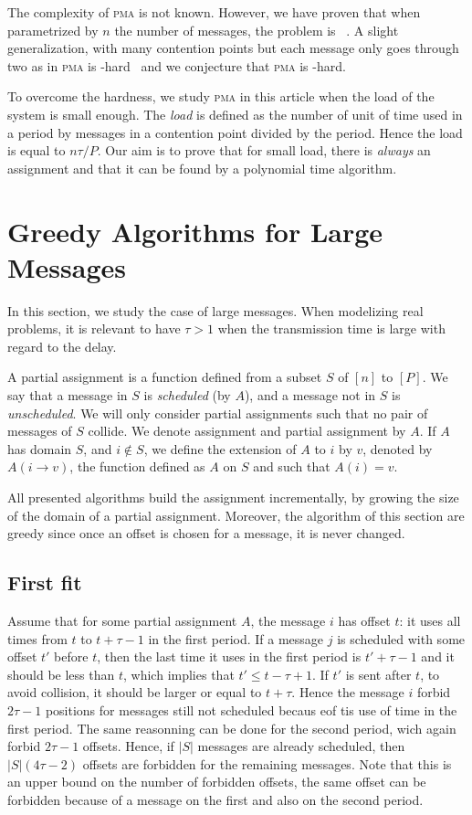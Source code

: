 \documentclass[10pt, conference, letterpaper]{IEEEtran}
\newcommand\pma{\textsc{pma}\xspace}
\begin{document}
The complexity of \pma is not known. However, we have proven that when parametrized by
$n$ the number of messages, the problem is \FPT~\cite{barth2018deterministic}.
A slight generalization, with many contention points but each message only goes through
two as in \pma is \NP-hard~\cite{barth2018deterministic} and we conjecture that \pma is \NP-hard.

To overcome the hardness, we study \pma in this article when the load of the system is small enough. The \emph{load} is defined as the number of unit of time used in a period by messages in a contention point divided by the period. Hence the load is equal to $n\tau /P$.
Our aim is to prove that for small load, there is \emph{always} an assignment and that it can be found by a polynomial time algorithm.


\section{Greedy Algorithms for Large Messages}

In this section, we study the case of large messages. When modelizing real problems,
it is relevant to have $\tau > 1$ when the transmission time is large with regard to
the delay.


A partial assignment is a function defined from a subset $S$ of $[n]$ to $[P]$.
We say that a message in $S$ is \emph{scheduled} (by $A$), and a message not in $S$ is \emph{unscheduled}. We will only consider partial assignments such that no pair of messages of $S$ collide. We denote assignment and partial assignment by $A$. If $A$ has domain 
$S$, and $i \notin S$, we define the extension of $A$ to $i$ by $v$, denoted by $A(i \rightarrow v)$, the function defined as $A$ on $S$ and such that $A(i) = v$.


All presented algorithms build the assignment incrementally, by growing the size of the domain of a partial assignment. Moreover, the algorithm of this section are greedy since once an offset is chosen for a message, it is never changed.


\subsection{First fit}


Assume that for some partial assignment $A$, the message $i$ has offset $t$: it uses all times from $t$ to $t + \tau -1$ in the first period. If a message $j$ is scheduled with some offset $t'$ before $t$, then the last time it uses in the first period is $t'+\tau-1$ and it should be less than $t$, which implies that $t' \leq t- \tau + 1$. If $t'$ is sent after $t$, to avoid collision, it should be larger or equal to $t+ \tau$. Hence the message $i$ forbid $2\tau -1$ positions for messages still not scheduled becaus eof tis use of time in the first period. The same reasonning can be done for the second period, wich again forbid $2\tau -1$ offsets. Hence, if $|S|$ messages are already scheduled, then $|S|(4\tau -2)$ offsets are forbidden for the remaining messages. Note that this is an
upper bound on the number of forbidden offsets, the same offset can be forbidden because
of a message on the first and also on the second period.
\end{document}
